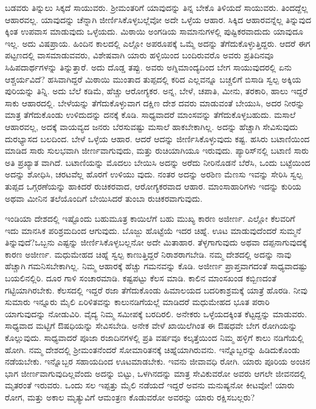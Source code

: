 ಬಡವರು ತಿನ್ನುಲು ಸಿಕ್ಕದೆ ಸಾಯುವರು. ಶ‍್ರೀಮಂತರಿಗೆ ಯಾವುದನ್ನು ತಿನ್ನ ಬೇಕೊ ತಿಳಿಯದೆ ಸಾಯುವರು. ತಿಂದದ್ದೆಲ್ಲ ಆಹಾರವಲ್ಲ. ಯಾವುದನ್ನು ಚೆನ್ನಾಗಿ ಜೀರ್ಣಿಸಿಕೊಳ್ಳಬಲ್ಲೆವೋ ಅದೇ ಒಳ್ಳೆಯ ಆಹಾರ. ಸಿಕ್ಕಿದ ಆಹಾರವನ್ನೆಲ್ಲ ತಿನ್ನುವುದ ಕ್ಕಿಂತ ಉಪವಾಸ ಮಾಡುವುದು ಒಳ್ಳೆಯದು. ಮಿಠಾಯಿ ಅಂಗಡಿಯ ಸಾಮಾನುಗಳಲ್ಲಿ ಪುಷ್ಟಿಕರವಾದುದು ಯಾವುದೂ ಇಲ್ಲ. ಅದು ವಿಷಪ್ರಾಯ. ಹಿಂದಿನ ಕಾಲದಲ್ಲಿ ಎಲ್ಲೋ ಅಪರೂಪಕ್ಕೆ ಒಮ್ಮೆ ಅದನ್ನು ತೆಗೆದುಕೊಳ್ಳುತ್ತಿದ್ದರು. ಆದರೆ ಈಗ ಪಟ್ಟಣದಲ್ಲಿ ವಾಸಮಾಡುವವರು, ವಿಶೇಷವಾಗಿ ಯಾರು ಹಳ್ಳಿಯಿಂದ ಬಂದಿರುವರೊ ಅವರು ಪ್ರತಿದಿನವೂ ಸಿಹಿಪದಾರ್ಥಗಳನ್ನು ತಿನ್ನುತ್ತಾರೆ. ಅದು ದೊಡ್ಡ ತಪ್ಪು. ಅವರು ಅಗ್ನಿಮಾಂದ್ಯದಿಂದ ಬೇಗ ಸಾಯುವುದರಲ್ಲಿ ಏನು ಆಶ್ಚರ್ಯವಿದೆ? ಹಸಿವಾಗಿದ್ದರೆ ಮಿಠಾಯಿ ಮುಂತಾದ ತುಪ್ಪದಲ್ಲಿ ಕರಿದ ಎಲ್ಲವನ್ನೂ ಬಚ್ಚಲಿಗೆ ಬಿಸಾಡಿ ಸ್ವಲ್ಪ ಅಕ್ಕಿಯ ಪುರಿಯನ್ನು ತಿನ್ನಿ. ಅದು ಬೆಲೆ ಕಡಿಮೆ, ಹೆಚ್ಚು ಆರೋಗ್ಯಕರ. ಅನ್ನ, ಬೇಳೆ, ಚಪಾತಿ, ಮೀನು, ತರಕಾರಿ, ಹಾಲು ಇದ್ದರೆ ಸಾಕು ಆಹಾರದಲ್ಲಿ. ಬೇಳೆಯನ್ನು ತೆಗೆದುಕೊಳ್ಳುವಾಗ ದಕ್ಷಿಣ ದೇಶ ದವರು ಮಾಡುವಂತೆ ಬೇಯುಸಿ, ಅದರ ನೀರನ್ನು ಮಾತ್ರ ತೆಗೆದುಕೊಂಡು ಉಳಿದುದನ್ನು ದನಕ್ಕೆ ಕೊಡಿ. ಸಾಧ್ಯವಾದರೆ ಮಾಂಸವನ್ನು ತೆಗೆದುಕೊಳ್ಳಬಹುದು. ಮಸಾಲೆ ಆಹಾರವಲ್ಲ, ಅದಕ್ಕೆ ವಾಯವ್ಯದ ಜನರು ಬೆರಸುವಷ್ಟು ಮಸಾಲೆ ಹಾಕಬೇಕಾಗಿಲ್ಲ. ಅದನ್ನು ಹೆಚ್ಚಾಗಿ ಸೇವಿಸುವುದು ದುರಭ್ಯಾಸದ ಬಲದಿಂದ. ಬೇಳೆ ಒಳ್ಳೆಯ ಆಹಾರ. ಆದರೆ ಆದನ್ನು ಜೀರ್ಣಿಸಿಕೊಳ್ಳುವುದು ಕಷ್ಟ. ಹಸಿರು ಬಟಾಣಿಯಿಂದ ಮಾಡಿದ ಸಾರು ಸುಲಭವಾಗಿ ಜೀರ್ಣವಾಗುವುದು, ಮತ್ತು ರುಚಿಯಾಗಿಯೂ ಇರುವುದು. ಪ್ಯಾರಿಸ್​ನಲ್ಲಿ ಬಟಾಣಿ ಸಾರು ಅತಿ ಪ್ರಖ್ಯಾತ ವಾಗಿದೆ. ಬಟಾಣಿಯನ್ನು ಮೊದಲು ಬೇಯಿಸಿ ಅದನ್ನು ಅರೆದು ನೀರಿನೊಡನೆ ಬೆರೆಸಿ, ಒಂದು ಬಟ್ಟೆಯಿಂದ ಅದನ್ನು ಶೋಧಿಸಿ, ಚರಟವೆಲ್ಲ ಹೊರಗೆ ಉಳಿಯು ವುದು. ನಂತರ ಅದನ್ನು ಅರಶಿಣ ಮೆಣಸು ಇವನ್ನು ಸೇರಿಸಿ ಸ್ವಲ್ಪ ತುಪ್ಪದ ಒಗ್ಗರಣೆಯನ್ನು ಹಾಕಿದರೆ ರುಚಿಕರವಾದ, ಆರೋಗ್ಯಕರವಾದ ಆಹಾರ. ಮಾಂಸಾಹಾರಿಗಳು ಇದನ್ನು ಕುರಿಯ ಅಥವಾ ಮೀನಿನ ತಲೆಯೊಂದಿಗೆ ಬೇಯಿಸಿದರೆ ತುಂಬಾ ರುಚಿಕರವಾಗುವುದು.

ಇಂಡಿಯಾ ದೇಶದಲ್ಲಿ ಇಷ್ಟೊಂದು ಬಹುಮೂತ್ರ ಕಾಯಿಲೆಗೆ ಬಹು ಮುಖ್ಯ ಕಾರಣ ಅಜೀರ್ಣ. ಎಲ್ಲೋ ಕೆಲವರಿಗೆ ಇದು ಮಾನಸಿಕ ಪರಿಶ್ರಮದಿಂದ ಆಗುವುದು. ಬೊಜ್ಜು ಹೊಟ್ಟೆಯೆ ಇದರ ಚಿಹ್ನೆ. ಊಟ ಮಾಡುವುದೆಂದರೆ ಸುಮ್ಮನೆ ತಿನ್ನುವುದೆ?ಒಬ್ಬನು ಎಷ್ಟನ್ನು ಜೀರ್ಣಿಸಿಕೊಳ್ಳಬಲ್ಲನೋ ಅದೇ ಮಿತಾಹಾರ. ತೆಳ್ಳಗಾಗುವುದು ಅಥವಾ ದಪ್ಪನಾಗುವುದಕ್ಕೆ ಕಾರಣ ಅಜೀರ್ಣ. ಮಧುಮೇಹದ ಚಿಹ್ನೆ ಸ್ವಲ್ಪ ಕಾಣುತ್ತಿದ್ದರೆ ನಿರಾಶರಾಗಬೇಡಿ. ನಮ್ಮ ದೇಶದಲ್ಲಿ ಅದನ್ನು ನಾವು ಹೆಚ್ಚಾಗಿ ಗಮನಿಸಬೇಕಾಗಿಲ್ಲ. ನಿಮ್ಮ ಆಹಾರಕ್ಕೆ ಹೆಚ್ಚು ಗಮನವನ್ನು ಕೊಡಿ. ಅಜೀರ್ಣ ಪ್ರಾಪ್ತವಾಗದಂತೆ ಸಾಧ್ಯವಾದಷ್ಟು ಬಯಲಿನಲ್ಲಿರಿ. ದೂರ ಗಾಳಿ ಸಂಚಾರಮಾಡಿ. ಕಷ್ಟಪಟ್ಟು ಕೆಲಸ ಮಾಡಿ. ಕಾಲಿನ ಮಾಂಸಖಂಡ ಕಬ್ಬಿಣದಂತೆ ಗಟ್ಟಿಯಾಗಿರಬೇಕು. ಕೆಲಸದಲ್ಲಿ ಇದ್ದರೆ ರಜಾ ತೆಗೆದುಕೊಂಡು ಹಿಮಾಲಯದ ಬದರಿಕಾಶ್ರಮಕ್ಕೆ ಯಾತ್ರೆ ಹೊರಡಿ. ನೀವು ಸುಮಾರು ಇನ್ನೂರು ಮೈಲಿ ಏರಿಳಿತವನ್ನು ಕಾಲುನಡಿಗೆಯಲ್ಲೆ ಮಾಡಿದರೆ ಮಧುಮೇಹದ ಭೂತ ಪರಾರಿ ಯಾಗುವುದನ್ನು ನೋಡುವಿರಿ. ವೈದ್ಯ ನಿಮ್ಮ ಸಮೀಪಕ್ಕೆ ಬರದಿರಲಿ. ಅನೇಕರು ಒಳ್ಳೆಯದಕ್ಕಿಂತ ಕೆಟ್ಟದ್ದನ್ನು ಮಾಡುವರು. ಸಾಧ್ಯವಾದ ಮಟ್ಟಿಗೆ ಔಷಧಿಯನ್ನು ಸೇವಿಸಬೇಡಿ. ಅನೇಕ ವೇಳೆ ಖಾಯಿಲೆಗಿಂತ ಈ ಔಷಧವೇ ಬೇಗ ರೋಗಿಯನ್ನು ಕೊಲ್ಲುವುದು. ಸಾಧ್ಯವಾದರೆ ಪೂಜಾ ರಜಾದಿನಗಳಲ್ಲಿ ಪ್ರತಿ ವರ್ಷವೂ ಕಲ್ಕತ್ತೆಯಿಂದ ನಿಮ್ಮ ಹಳ್ಳಿಗೆ ಕಾಲು ನಡಿಗೆಯಲ್ಲಿ ಹೋಗಿ. ನಮ್ಮ ದೇಶದಲ್ಲಿ ಶ‍್ರೀಮಂತನೆಂದರೆ ಸೋಮಾರಿತನಕ್ಕೆ ಚಿಹ್ನೆಯಾಗಿರುವನು. ಇನ್ನೊಬ್ಬರನ್ನು ಹಿಡಿದುಕೊಂಡು ನಡೆಯಬೇಕು. ಇನ್ನೊಬ್ಬರ ಸಹಾಯದಿಂದ ಊಟಮಾಡಬೇಕು. ಇವನು ಜೀವಾವಧಿ ರೋಗಿ. ಯಾರು ಪೂರಿಯ ಅಂಚಿನ ಭಾಗ ಜೀರ್ಣವಾಗುವುದಿಲ್ಲವೆಂದು ಅದನ್ನು ಬಿಟ್ಟು, ಒಳಗಿನದನ್ನು ಮಾತ್ರ ಸೇವಿಕುವರೋ ಅವರು ಆಗಲೇ ಜೀವನದಲ್ಲಿ ಮೃತರಂತೆ ಇರುವರು. ಒಂದು ಸಲ ಇಪ್ಪತ್ತು ಮೈಲಿ ನಡೆಯದೆ ಇದ್ದರೆ ಅವನು ಮನುಷ್ಯನೋ ಕೀಟವೋ! ಯಾರು ರೋಗ, ಮತ್ತು ಅಕಾಲ ಮೃತ್ಯುವಿಗೆ ಆಮಂತ್ರಣ ಕೊಡುವರೋ ಅವರನ್ನು ಯಾರು ರಕ್ಷಿಸಬಲ್ಲರು?

